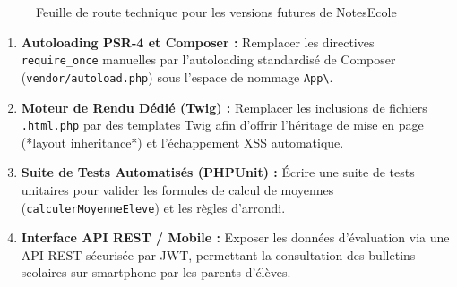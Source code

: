 \documentclass[11pt,a4paper,oneside]{report}
\begin{document}
\begin{figure}[H]
    \centering
    \caption{Feuille de route technique pour les versions futures de NotesEcole}
    \label{fig:roadmap}
\end{figure}

\begin{enumerate}
    \item \textbf{Autoloading PSR-4 et Composer :} Remplacer les directives \texttt{require\_once} manuelles par l'autoloading standardisé de Composer (\texttt{vendor/autoload.php}) sous l'espace de nommage \texttt{App\textbackslash}.
    \item \textbf{Moteur de Rendu Dédié (Twig) :} Remplacer les inclusions de fichiers \texttt{.html.php} par des templates Twig afin d'offrir l'héritage de mise en page (*layout inheritance*) et l'échappement XSS automatique.
    \item \textbf{Suite de Tests Automatisés (PHPUnit) :} Écrire une suite de tests unitaires pour valider les formules de calcul de moyennes (\texttt{calculerMoyenneEleve}) et les règles d'arrondi.
    \item \textbf{Interface API REST / Mobile :} Exposer les données d'évaluation via une API REST sécurisée par JWT, permettant la consultation des bulletins scolaires sur smartphone par les parents d'élèves.
\end{enumerate}

\end{document}
